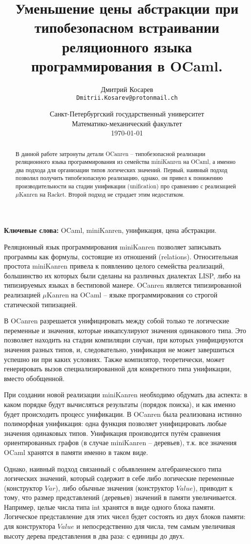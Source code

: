 \documentclass[10pt]{article}
\title{Уменьшение цены абстракции при типобезопасном встраивании реляционного языка программирования в OCaml.}
\author{
        Дмитрий Косарев\\ \texttt{Dmitrii.Kosarev@protonmail.ch}
}
\date{
  Санкт-Петербургский государственный университет\\
  Математико-механический факультет\\
  \today
}
\begin{document}
\maketitle

\begin{abstract}
В данной работе затронуты детали OCanren -- типобезопасной реализации реляционного языка программирования
из семейства miniKanren на OCaml, а именно два подхода для организации типов логических значений. Первый,
наивный подход позволил получить типобезопасную реализацию, однако, он привел к понижению производительности
на стадии унификации (unification) про сравнению с реализацией $\mu$Kanren на Racket. Второй подход не 
страдает этим недостатком.

\end{abstract}

\textbf{Ключевые слова:} OCaml, miniKanren, унификация, цена абстракции.

\vspace{5mm}

Реляционный язык программирования miniKanren позволяет записывать программы как формулы, состоящие из отношений
(relations). Относительная простота miniKanren привела к появлению целого семейства реализаций, большинство их 
которых были сделаны на различных диалектах LISP, либо на типизируемых языках в бестиповой манере. OCanren 
является типизированной реализацией $\mu$Kanren на OCaml -- языке программирования со строгой статической 
типизацией.

В OCanren разрешается унифицировать между собой только те логические переменные и значения, которые инкапсулируют
значения одинакового типа. Это позволяет находить на стадии компиляции случаи, при которых унифицируются 
значения разных типов, и, следовательно, унификация не может завершиться успешно ни при каких условиях. Также
компилятор, теоретически, может генерировать вызов специализированной для конкретного типа унификации, вместо 
обобщенной.

При создании новой реализации miniKanren необходимо обдумать два аспекта: в каком порядке будут вычисляться 
результаты (порядок поиска), и как именно будет происходить процесс унификации. В OCanren была реализована истинно 
полиморфная унификация: одна функция позволяет унифицировать любые значения одинаковых типов. Унификация производится
путём сравнения ориентированных графов (в случае miniKanren -- деревьев), т.к. все значения OCaml хранятся в 
памяти именно в таком виде.

Однако, наивный подход связанный с объявлением алгебраического типа логических значений, который содержит в себе 
либо логические переменные (конструктор $Var$), либо обычные значения (конструктор $Value$), приводит к тому, что 
размер представлений (деревьев) значений в памяти увеличивается. 
Например, целые числа типа int хранятся в виде одного блока памяти. Логическое представление для этих чисел
будет состоять из двух блоков памяти: для конструктора $Value$ и непосредственно для числа, тем самым увеличивая 
высоту дерева представления в два раза: с единицы до двух.
\end{document}
